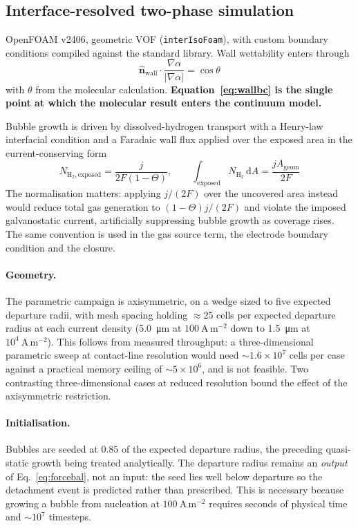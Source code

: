 \documentclass[11pt,a4paper]{article}
\begin{document}
\subsection{Interface-resolved two-phase simulation}
OpenFOAM v2406, geometric VOF (\texttt{interIsoFoam}), with custom boundary conditions compiled
against the standard library. Wall wettability enters through
\begin{equation}
\hat{\mathbf{n}}_{\mathrm{wall}}\cdot\frac{\nabla\alpha}{|\nabla\alpha|} = \cos\theta
\label{eq:wallbc}
\end{equation}
with $\theta$ from the molecular calculation. \textbf{Equation~\eqref{eq:wallbc} is the single point
at which the molecular result enters the continuum model.}

Bubble growth is driven by dissolved-hydrogen transport with a Henry-law interfacial condition and a
Faradaic wall flux applied over the exposed area in the current-conserving form
\begin{equation}
N_{\mathrm{H_2,exposed}} = \frac{j}{2F(1-\Theta)},\qquad
\int_{\mathrm{exposed}} N_{\mathrm{H_2}}\,\mathrm{d}A = \frac{j A_{\mathrm{geom}}}{2F}
\label{eq:flux}
\end{equation}
The normalisation matters: applying $j/(2F)$ over the uncovered area instead would reduce total gas
generation to $(1-\Theta)j/(2F)$ and violate the imposed galvanostatic current, artificially
suppressing bubble growth as coverage rises. The same convention is used in the gas source term, the
electrode boundary condition and the closure.

\paragraph{Geometry.} The parametric campaign is axisymmetric, on a wedge sized to five expected
departure radii, with mesh spacing holding $\approx$25 cells per expected departure radius at each
current density (\SI{5.0}{\micro\metre} at $100\ \mathrm{A\,m^{-2}}$ down to \SI{1.5}{\micro\metre} at
$10^4\ \mathrm{A\,m^{-2}}$). This follows from measured throughput: a three-dimensional parametric
sweep at contact-line resolution would need $\sim1.6\times10^7$ cells per case against a practical
memory ceiling of $\sim5\times10^6$, and is not feasible. Two contrasting three-dimensional cases at
reduced resolution bound the effect of the axisymmetric restriction.

\paragraph{Initialisation.} Bubbles are seeded at $0.85$ of the expected departure radius, the
preceding quasi-static growth being treated analytically. The departure radius remains an
\emph{output} of Eq.~\eqref{eq:forcebal}, not an input: the seed lies well below departure so the
detachment event is predicted rather than prescribed. This is necessary because growing a bubble from
nucleation at $100\ \mathrm{A\,m^{-2}}$ requires seconds of physical time and $\sim10^7$ timesteps.
\end{document}
